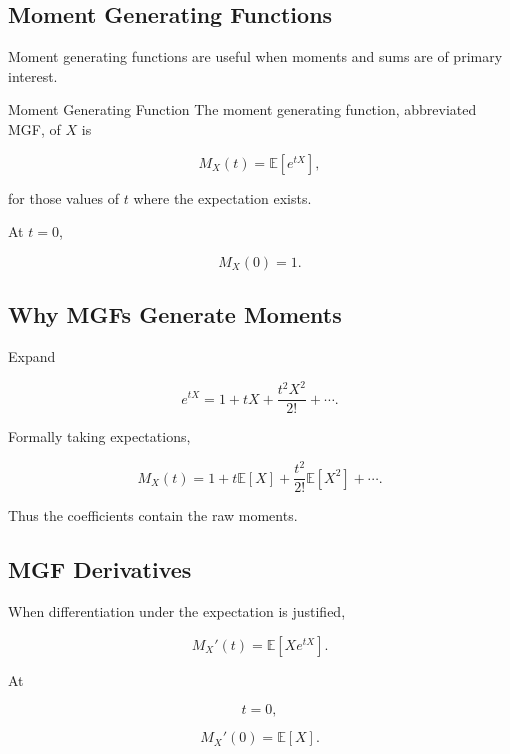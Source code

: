 \subsection{Moment Generating Functions}
\label{subsec:moment-generating-functions}

Moment generating functions are useful when moments and sums are of
primary interest.

\begin{definitionbox}{Moment Generating Function}
The moment generating function, abbreviated MGF, of \(X\) is

\[
\boxed{
M_X(t)
=
\mathbb{E}[e^{tX}],
}
\]

for those values of \(t\) where the expectation exists.
\end{definitionbox}

At \(t=0\),

\[
\boxed{
M_X(0)=1.
}
\]

\subsection{Why MGFs Generate Moments}
\label{subsec:why-mgfs-generate-moments}

Expand

\[
e^{tX}
=
1+tX+\frac{t^2X^2}{2!}+\cdots.
\]

Formally taking expectations,

\[
M_X(t)
=
1
+
t\mathbb{E}[X]
+
\frac{t^2}{2!}\mathbb{E}[X^2]
+\cdots.
\]

Thus the coefficients contain the raw moments.

\subsection{MGF Derivatives}
\label{subsec:mgf-derivatives}

When differentiation under the expectation is justified,

\[
M_X'(t)
=
\mathbb{E}[Xe^{tX}].
\]

At

\[
t=0,
\]

\[
\boxed{
M_X'(0)
=
\mathbb{E}[X].
}
\]

